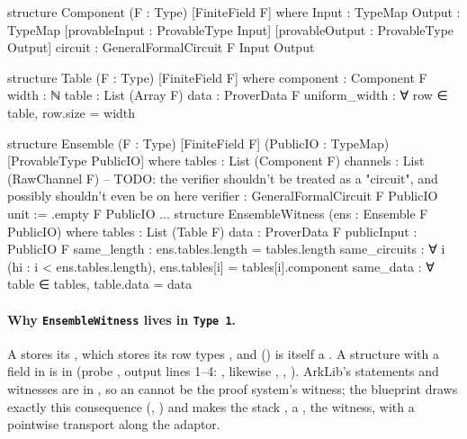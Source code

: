 \begin{leancode}
structure Component (F : Type) [FiniteField F] where
  {Input : TypeMap} {Output : TypeMap}
  [provableInput : ProvableType Input] [provableOutput : ProvableType Output]
  circuit : GeneralFormalCircuit F Input Output
\end{leancode}



\begin{leancode}
structure Table (F : Type) [FiniteField F] where
  component : Component F
  width : ℕ
  table : List (Array F)
  data : ProverData F
  uniform_width : ∀ row ∈ table, row.size = width
\end{leancode}



\begin{leancode}
structure Ensemble (F : Type) [FiniteField F] (PublicIO : TypeMap) [ProvableType PublicIO] where
  tables : List (Component F)
  channels : List (RawChannel F)
  -- TODO: the verifier shouldn't be treated as a "circuit", and possibly shouldn't even be on here
  verifier : GeneralFormalCircuit F PublicIO unit := .empty F PublicIO
  ...
structure EnsembleWitness (ens : Ensemble F PublicIO) where
  tables : List (Table F)
  data : ProverData F
  publicInput : PublicIO F
  same_length : ens.tables.length = tables.length
  same_circuits : ∀ i (hi : i < ens.tables.length), ens.tables[i] = tables[i].component
  same_data : ∀ table ∈ tables, table.data = data
\end{leancode}


\paragraph{Why \texorpdfstring{\texttt{EnsembleWitness}}{EnsembleWitness} lives in \texorpdfstring{\texttt{Type 1}}{Type 1}.}
A  stores its , which stores its row types
, and 
(\allowbreak{}\allowbreak{}) is itself a . A structure with a field in
 is in  (probe , output lines 1--4:
\allowbreak{}\allowbreak{}, likewise ,
, ). ArkLib's statements and witnesses are in ,
so an  cannot be the proof system's witness; the blueprint draws exactly
this consequence (, ) and makes the stack
, a , the witness, with a pointwise transport along the adaptor.

